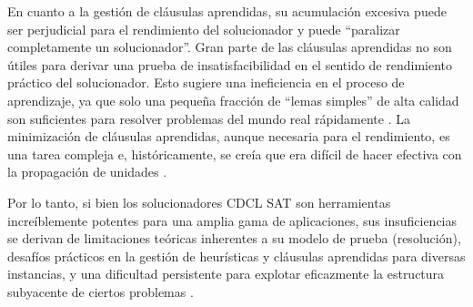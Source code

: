 En cuanto a la gesti\'on de cl\'ausulas aprendidas, su acumulación excesiva puede ser perjudicial para el rendimiento del solucionador y puede ``paralizar completamente un solucionador''. Gran parte de las cláusulas aprendidas no son útiles para derivar una prueba de insatisfacibilidad en el sentido de rendimiento práctico del solucionador. Esto sugiere una ineficiencia en el proceso de aprendizaje, ya que solo una pequeña fracción de ``lemas simples'' de alta calidad son suficientes para resolver problemas del mundo real rápidamente  \cite{oh2016improving}. La minimización de cláusulas aprendidas, aunque necesaria para el rendimiento, es una tarea compleja e, históricamente, se creía que era difícil de hacer efectiva con la propagación de unidades \cite{luo2017clause_minimization}.

Por lo tanto, si bien los solucionadores CDCL SAT son herramientas increíblemente potentes para una amplia gama de aplicaciones, sus insuficiencias se derivan de limitaciones teóricas inherentes a su modelo de prueba (resolución), desafíos prácticos en la gestión de heurísticas y cláusulas aprendidas para diversas instancias, y una dificultad persistente para explotar eficazmente la estructura subyacente de ciertos problemas \cite{ganesh_unreasonable}.






